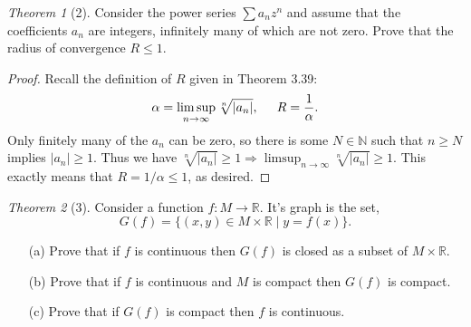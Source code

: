 \documentclass[12pt]{article}
\theoremstyle{remark}
\theoremstyle{named}
\newtheorem*{theorem}{Theorem}
\renewcommand{\a}{\alpha}
\newcommand{\N}{\mathbb N}
\begin{document}
\begin{theorem}[2]
    Consider the power series \(\sum a_n z^n\) and assume that the coefficients \(a_n\) are integers, infinitely many of which are not zero. Prove that the radius of convergence \(R \le 1\).
\end{theorem}

\begin{proof}
    Recall the definition of \(R\) given in Theorem 3.39: 
    \[\a = \limsup_{n \to \infty}\sqrt[n]{|a_n|}, \hspace{5mm} R = \frac{1}{\a}.\] 
    Only finitely many of the \(a_n\) can be zero, so there is some \(N \in \N\) such that \(n \ge N\) implies \(|a_n| \ge 1\). Thus we have \(\sqrt[n]{|a_n|} \ge 1 \Rightarrow \limsup_{n \to \infty}\sqrt[n]{|a_n|} \ge 1\). This exactly means that \(R = 1 / \a \le 1\), as desired.
\end{proof}

\begin{theorem}[3]
    Consider a function \(f : M \to \mathbb R\). It's graph is the set,
    \[G(f) = \{(x, y) \in M \times \mathbb R \mid y = f(x)\}.\]
    \begin{enumerate}
        \item[(a)] Prove that if \(f\) is continuous then \(G(f)\) is closed as a subset of \(M \times \mathbb R\). 
        \item[(b)] Prove that if \(f\) is continuous and \(M\) is compact then \(G(f)\) is compact.
        \item[(c)] Prove that if \(G(f)\) is compact then \(f\) is continuous. 
    \end{enumerate}
\end{theorem}
\end{document}

